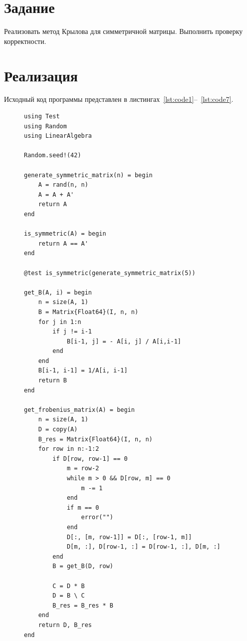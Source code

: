 \documentclass[a4paper, 14pt]{extarticle}
\begin{document}
\renewcommand{\ttdefault}{pcr}

\setlength{\tabcolsep}{3pt}
\newpage
\setcounter{page}{2}

\section{Задание}\label{Sect::task}

Реализовать метод Крылова для симметричной матрицы. Выполнить проверку
корректности.

\section{Реализация}\label{Sect::impl}

Исходный код программы представлен в листингах~\ref{lst:code1}--~\ref{lst:code7}.

\begin{figure}[!htb]
\begin{lstlisting}[language={},caption={Метод Крылова},label={lst:code1}]
using Test
using Random
using LinearAlgebra

Random.seed!(42)

generate_symmetric_matrix(n) = begin
    A = rand(n, n)
    A = A + A'
    return A
end

is_symmetric(A) = begin
    return A == A'
end

@test is_symmetric(generate_symmetric_matrix(5))

get_B(A, i) = begin
    n = size(A, 1)
    B = Matrix{Float64}(I, n, n)
    for j in 1:n
        if j != i-1
            B[i-1, j] = - A[i, j] / A[i,i-1]
        end
    end
    B[i-1, i-1] = 1/A[i, i-1]
    return B
end

get_frobenius_matrix(A) = begin
    n = size(A, 1)
    D = copy(A)
    B_res = Matrix{Float64}(I, n, n)
    for row in n:-1:2
        if D[row, row-1] == 0
            m = row-2
            while m > 0 && D[row, m] == 0
                m -= 1
            end
            if m == 0
                error("")
            end
            D[:, [m, row-1]] = D[:, [row-1, m]]
            D[m, :], D[row-1, :] = D[row-1, :], D[m, :]
        end
        B = get_B(D, row)

        C = D * B
        D = B \ C
        B_res = B_res * B
    end
    return D, B_res
end

\end{lstlisting}
\end{figure}

\end{document}
